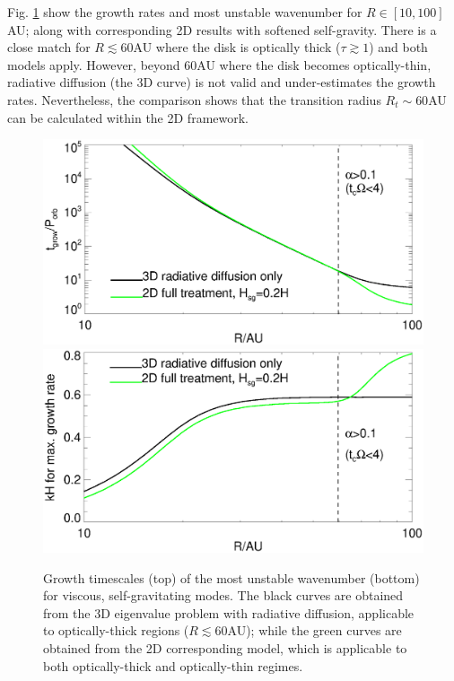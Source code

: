 Fig. \ref{rafikov_growth3d} show the growth rates and most unstable
wavenumber for $R\in[10,100]$AU; along with corresponding 2D 
results with softened self-gravity. There is a close match for
$R\lesssim60$AU where the disk is optically thick ($\tau\gtrsim
1$) and both models apply. However, beyond $60$AU where the disk
becomes optically-thin, radiative diffusion (the 3D curve) is not
valid and under-estimates the growth rates. %
Nevertheless, the comparison shows that the transition radius
$R_t\sim60$AU can be calculated within the 2D framework.  

\begin{figure}
  \includegraphics[width=\linewidth,clip=true,trim=0cm 1.5cm 0cm
    0.0cm]{figures/ppd_3d_rates}\\
  \includegraphics[width=\linewidth,clip=true,trim=0cm 0cm 0cm
    0.8cm]{figures/ppd_3d_maxk}
  \caption{Growth timescales (top) of the most unstable
    wavenumber (bottom) for viscous, 
    self-gravitating modes. The black curves are obtained
    from the 3D eigenvalue problem with radiative diffusion,
    applicable to optically-thick regions ($R\lesssim 60$AU); 
    while the green curves are obtained from the 2D corresponding
    model, which is applicable to both optically-thick and
    optically-thin regimes.  
    \label{rafikov_growth3d}}
\end{figure}



